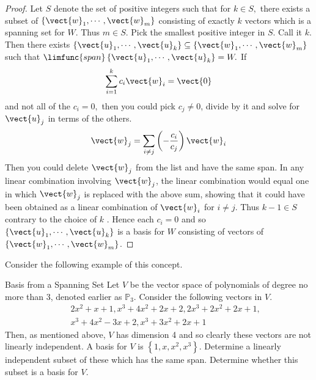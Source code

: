 \begin{proof}
Let $S$ denote the set of positive integers such that for $
k\in S,$ there exists a subset of $\left\{ \vect{w}_{1},\cdots ,\vect{w}
_{m}\right\} $ consisting of exactly $k$ vectors which is a spanning set for 
$W$. Thus $m\in S$. Pick the smallest positive integer in $S$. Call it $k$.
Then there exists $\left\{ \vect{u}_{1},\cdots ,\vect{u}_{k}\right\} \subseteq
\left\{ \vect{w}_{1},\cdots ,\vect{w}_{m}\right\} $ such that $\limfunc{span}
\left\{ \vect{u}_{1},\cdots ,\vect{u}_{k}\right\} =W.$ If 
\begin{equation*}
\sum_{i=1}^{k}c_{i}\vect{w}_{i}=\vect{0}
\end{equation*}
and not all of the $c_{i}=0,$ then you could pick $c_{j}\neq 0$, divide by
it and solve for $\vect{u}_{j}$ in terms of the others. 
\begin{equation*}
\vect{w}_{j}=\sum_{i\neq j}\left( -\frac{c_{i}}{c_{j}}\right) \vect{w}_{i}
\end{equation*}
Then you could delete $\vect{w}_{j}$ from the list and have the same span.
In any linear combination involving $\vect{w}_{j}$, the linear
combination would equal one in which $\vect{w}_{j}$ is replaced with the
above sum, showing that it could have been obtained as a linear combination
of $\vect{w}_{i}$ for $i\neq j$. Thus $k-1\in S$ contrary to the choice of $k$
. Hence each $c_{i}=0$ and so $\left\{ \vect{u}_{1},\cdots ,\vect{u}
_{k}\right\} $ is a basis for $W$ consisting of vectors of $\left\{ \vect{w}
_{1},\cdots ,\vect{w}_{m}\right\} $. 
\end{proof}

Consider the following example of this concept. 

\begin{example}{Basis from a Spanning Set}
Let $V$ be the vector space of polynomials of degree no more than 3,
denoted earlier as $\mathbb{P}_{3}$. Consider the following vectors in $V$.
\begin{eqnarray*}
&&2x^{2}+x+1,x^{3}+4x^{2}+2x+2,2x^{3}+2x^{2}+2x+1, \\
&&x^{3}+4x^{2}-3x+2,x^{3}+3x^{2}+2x+1
\end{eqnarray*}
Then, as mentioned above, $V$ has dimension 4 and so clearly these vectors
are not linearly independent. A basis for $V$ is $\left\{
1,x,x^{2},x^{3}\right\} $. Determine a linearly independent subset of these
which has the same span. Determine whether this subset is a basis for $V$.
\end{example}

